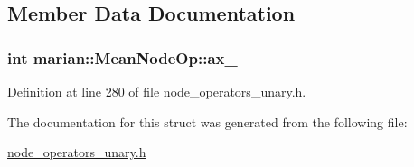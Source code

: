 \subsection{Member Data Documentation}
\subsubsection[{\texorpdfstring{ax\+\_\+}{ax_}}]{\setlength{\rightskip}{0pt plus 5cm}int marian\+::\+Mean\+Node\+Op\+::ax\+\_\+}\hypertarget{structmarian_1_1MeanNodeOp_ad13bf2fe5226515ff69604464968e14f}{}\label{structmarian_1_1MeanNodeOp_ad13bf2fe5226515ff69604464968e14f}


Definition at line 280 of file node\+\_\+operators\+\_\+unary.\+h.



The documentation for this struct was generated from the following file\+:\begin{DoxyCompactItemize}
\item 
\hyperlink{node__operators__unary_8h}{node\+\_\+operators\+\_\+unary.\+h}\end{DoxyCompactItemize}
